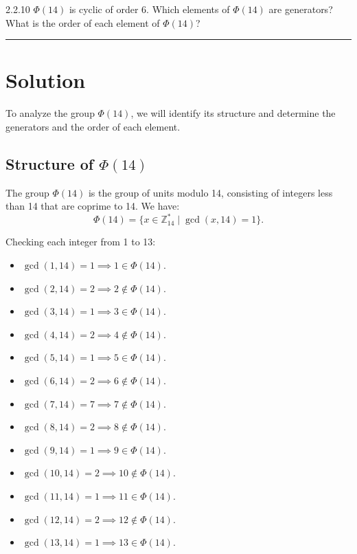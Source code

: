 \documentclass[12pt]{amsart}
\theoremstyle{definition}
\numberwithin{equation}{section}
\begin{document}
\begin{exercise}{2.2.10} 
    \(\Phi(14)\) is cyclic of order 6. Which elements of \(\Phi(14)\) are generators? What is the order of each element of \(\Phi(14)\)?
    
    \noindent\rule{\linewidth}{1pt}
    
    \section*{Solution}
    
    To analyze the group \(\Phi(14)\), we will identify its structure and determine the generators and the order of each element.
    
    \subsection*{Structure of \(\Phi(14)\)}
    
    The group \(\Phi(14)\) is the group of units modulo 14, consisting of integers less than 14 that are coprime to 14. We have:
    \[
    \Phi(14) = \{x \in \mathbb{Z}_{14}^* \mid \gcd(x, 14) = 1\}.
    \]
    
    Checking each integer from 1 to 13:
    \begin{itemize}[label=--]
        \item \( \gcd(1, 14) = 1 \implies 1 \in \Phi(14)\).
        \item \( \gcd(2, 14) = 2 \implies 2 \not\in \Phi(14)\).
        \item \( \gcd(3, 14) = 1 \implies 3 \in \Phi(14)\).
        \item \( \gcd(4, 14) = 2 \implies 4 \not\in \Phi(14)\).
        \item \( \gcd(5, 14) = 1 \implies 5 \in \Phi(14)\).
        \item \( \gcd(6, 14) = 2 \implies 6 \not\in \Phi(14)\).
        \item \( \gcd(7, 14) = 7 \implies 7 \not\in \Phi(14)\).
        \item \( \gcd(8, 14) = 2 \implies 8 \not\in \Phi(14)\).
        \item \( \gcd(9, 14) = 1 \implies 9 \in \Phi(14)\).
        \item \( \gcd(10, 14) = 2 \implies 10 \not\in \Phi(14)\).
        \item \( \gcd(11, 14) = 1 \implies 11 \in \Phi(14)\).
        \item \( \gcd(12, 14) = 2 \implies 12 \not\in \Phi(14)\).
        \item \( \gcd(13, 14) = 1 \implies 13 \in \Phi(14)\).
    \end{itemize}
    

\end{exercise}
\end{document}

